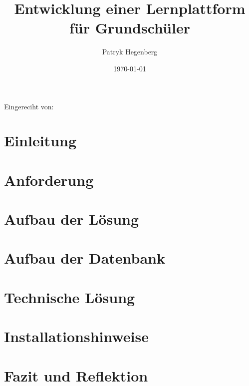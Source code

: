 \documentclass[fontsize:11pt]{article}
\title{Entwicklung einer Lernplattform für Grundschüler}
\author{Patryk Hegenberg}
\date{\today}
\begin{document}
\maketitle
Eingereciht von: 
\thispagestyle{empty}
  
\section{Einleitung}

        
\section{Anforderung}

        
\section{Aufbau der Lösung}

\section{Aufbau der Datenbank}
 
\section{Technische Lösung}

\section{Installationshinweise}

\section{Fazit und Reflektion}
\end{document}
